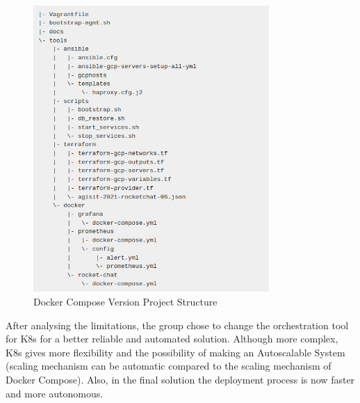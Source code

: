 \documentclass[12pt,a4paper,oneside]{report}
\begin{document}
\begin{figure}[h]
    \centering
    \includegraphics[width=0.8\textwidth]{./pictures/docker-compose-version-proj-structure.png}
    \caption{Docker Compose Version Project Structure}
    \label{fig:docker-compose-version-proj-struc}
\end{figure}

After analysing the limitations, the group chose to change the orchestration tool for \ac{K8s} for a better reliable and automated solution. Although more complex, \ac{K8s} gives more flexibility and the possibility of making an Autoscalable System (scaling mechanism can be automatic compared to the scaling mechanism of Docker Compose). Also, in the final solution the deployment process is now faster and more autonomous.
\end{document}
